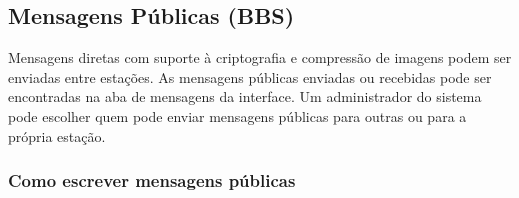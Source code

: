 \documentclass[11pt,a4paper]{article}
\begin{document}
\subsection{Mensagens Públicas  (BBS)}

Mensagens diretas com suporte à criptografia e compressão de imagens podem ser enviadas entre estações. As mensagens públicas enviadas ou recebidas pode ser encontradas na aba de mensagens da interface. Um administrador do sistema pode escolher quem pode enviar mensagens públicas para outras ou para a própria estação.

\subsubsection{Como escrever mensagens públicas}
\end{document}
